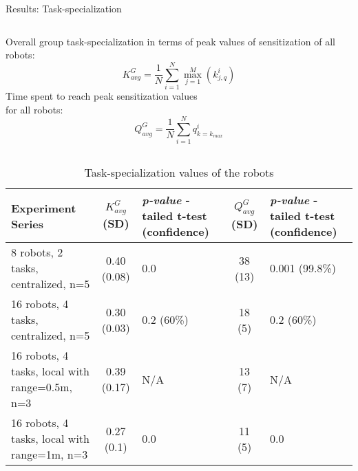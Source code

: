 \documentclass{beamer}
\begin{document}
\begin{frame}[t]{Results: Task-specialization}
\begin{small}
\begin{columns}
\alert{Overall group task-specialization} in terms of peak values of sensitization of all robots:
\vspace*{-0.25cm}
\begin{equation}
K^G_{avg} = \frac{1}{N}\sum_{i=1}^{N} \max_{j=1}^M\left ( k^i_{j, q} \right ) 
\label{eqn:K-G}
\end{equation}
\alert{Time spent to reach peak sensitization values}\\ for all robots:
\vspace*{-0.25cm}
\begin{equation}
Q^G_{avg}= \frac{1}{N}\sum_{i=1}^{N} q^i_{k=k_{max}}
\label{eqn:Q-G}
\end{equation}
\end{columns}
\end{small}
\vspace*{-0.25cm}
\begin{table}
\begin{scriptsize}
\begin{center}
\caption{\scriptsize Task-specialization values of the robots}
\begin{tabular}{|m{1.2in}|c|m{0.7in}|c|m{0.7in}|}
\hline Experiment Series & $ K^G_{avg}$ (SD) & \textit{ p-value} \protect\newline 1-tailed t-test (confidence)  & $ Q^G_{avg}$ (SD) & \textit{ p-value} \protect\newline 1-tailed t-test \protect\newline (confidence) \\ 
\hline \alert{8 robots, 2 tasks, centralized, n=5} & 0.40 (0.08)& 0.0 & 38 (13) & \alert{ 0.001 (99.8\%)}\\ 
\hline \alert{16 robots, 4 tasks, centralized, n=5} & 0.30 (0.03) & \alert{0.2 (60\%)} &  18 (5) & \alert{0.2 (60\%)}\\
\hline \alert{16 robots, 4 tasks, local  with range=0.5m, n=3}  & 0.39 (0.17) & N/A & 13 (7) & N/A \\
\hline \alert{16 robots, 4 tasks, local  with range=1m, n=3}  & 0.27 (0.1)& 0.0 & 11 (5) & 0.0\\
\hline
\end{tabular}
\label{table:motion-cmp} 
\end{center}
\end{scriptsize}
\end{table}
\end{frame}
\end{document}
